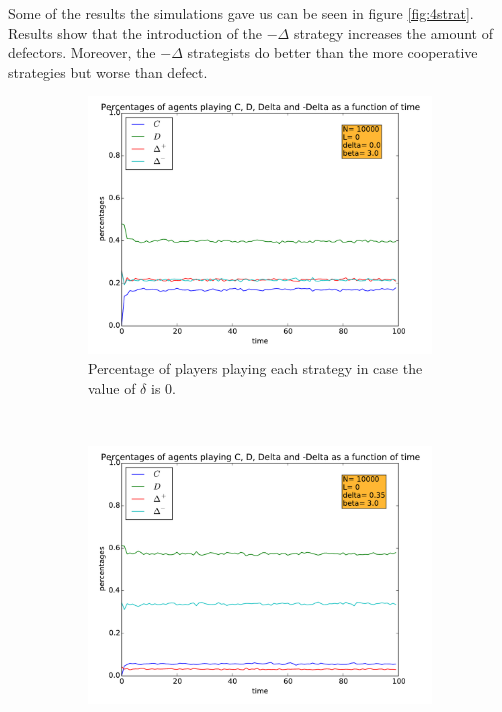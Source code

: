 \documentclass{article}
\begin{document}
Some of the results the simulations gave us can be seen in figure \ref{fig:4strat}. Results show that the introduction of the $-\Delta$ strategy increases the amount of defectors. Moreover, the $-\Delta$ strategists do better than the more cooperative strategies but worse than defect.
\begin{figure}[htbp] 
\centering
\begin{subfigure}[t]{0.47\textwidth}
  \centering
  \includegraphics[width=\textwidth]{./Figures/4strategies-nodelta}
  \caption{Percentage of players playing each strategy in case the value of $\delta$ is 0.}
  \label{fig:4strat_nodelta} 
\end{subfigure}%
~
~
\begin{subfigure}[t]{0.47\textwidth}
  \centering
  \includegraphics[width=\textwidth]{./Figures/4strategies-delta}

\end{subfigure}
\end{figure}
\end{document}
